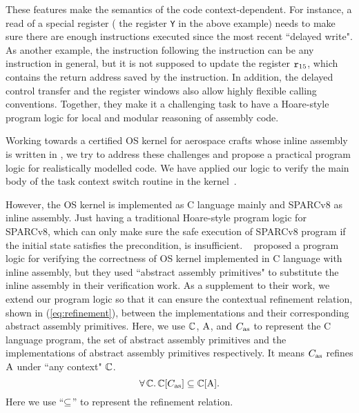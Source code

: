 These features make the semantics of the \sparc{} code
context-dependent. For instance, a read of a special register
(\eg{} the register {\tt Y} in the above example) needs to
make sure there are enough instructions executed since the
most recent ``delayed write". As another example,
the instruction following the \call{} instruction can be any
instruction in general, but it is not supposed to
update the register $\texttt{r}_{15}$, which contains the return
address saved by the \call{} instruction.
In addition,
the delayed control transfer
and the register windows also allow highly flexible calling
conventions. Together, they make it a challenging task
to have a Hoare-style program logic for local and modular
reasoning of \sparc{} assembly code.

Working towards a certified OS kernel for aerospace
crafts whose inline assembly is written in \sparc,
we try to address these challenges and propose a practical
program logic for realistically modelled \sparc{} code.
We have applied our logic to verify the main body of
the task context switch routine in the kernel~\cite{zha18aplas}.

However, the OS kernel is implemented as
C language mainly and SPARCv8 as inline assembly.
Just having a traditional Hoare-style
program logic for SPARCv8, which can only make sure
the safe execution of SPARCv8 program if the initial
state satisfies the precondition, is insufficient.
~\cite{Xu16cav} proposed a program logic for
verifying the correctness of OS kernel implemented in
C language with inline assembly,
but they used ``abstract assembly primitives" to
substitute the inline assembly in their verification work.
As a supplement to their work, we extend our
program logic so that it can ensure the
contextual refinement relation,
shown in (\ref{eq:refinement}),
between the implementations and
their corresponding abstract assembly primitives.
Here, we use $\mathbb{C}$, $\text{A}$,
and $C_{\text{as}}$ to represent the C language program,
the set of abstract assembly
primitives and the implementations of
abstract assembly primitives respectively.
It means $C_{\text{as}}$ refines $\text{A}$ under
``any context" $\mathbb{C}$.
\begin{equation}
    \forall \, \mathbb{C}. \,
    \mathbb{C}[C_{\text{as}}] \subseteq \mathbb{C}[\text{A}].
    \label{eq:refinement}
\end{equation}
%
Here we use ``$\subseteq$'' to represent the refinement
relation.
%


